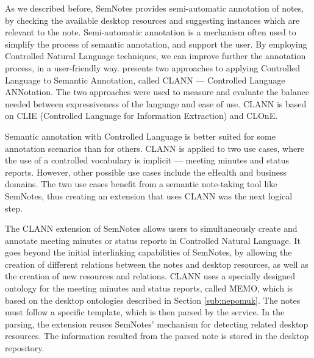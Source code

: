 As we described before, SemNotes provides semi-automatic annotation of notes, by checking the available desktop resources and suggesting instances which are relevant to the note. Semi-automatic annotation is a mechanism often used to simplify the process of semantic annotation, and support the user. By employing Controlled Natural Language techniques, we can improve further the annotation process, in a user-friendly way. \cite{Davis2009} presents two approaches to applying Controlled Language to Semantic Annotation, called CLANN --- Controlled Language ANNotation. The two approaches were used to measure and evaluate the balance needed between expressiveness of the language and ease of use. CLANN is based on CLIE (Controlled Language for Information Extraction) and CLOnE. 

Semantic annotation with Controlled Language is better suited for some annotation scenarios than for others. CLANN is applied to two use cases, where the use of a controlled vocabulary is implicit --- meeting minutes and status reports. However, other possible use cases include the eHealth and business domains. The two use cases benefit from a semantic note-taking tool like SemNotes, thus creating an extension that uses CLANN was the next logical step.

The CLANN extension of SemNotes allows users to simultaneously create and annotate meeting minutes or status reports in Controlled Natural Language. It goes beyond the initial interlinking capabilities of SemNotes, by allowing the creation of different relations between the notes and desktop resources, as well as the creation of new resources and relations. CLANN uses a specially designed ontology for the meeting minutes and status reports, called MEMO, which is based on the desktop ontologies described in Section \ref{sub:nepomuk}. The notes must follow a specific template, which is then parsed by the service. In the parsing, the extension reuses SemNotes' mechanism for detecting related desktop resources. The information resulted from the parsed note is stored in the desktop repository.
